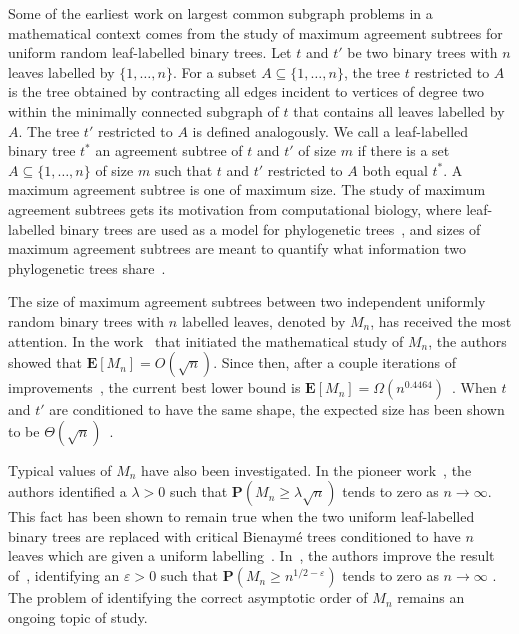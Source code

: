 \documentclass[11pt,reqno]{amsart}
\newcommand{\1}{\mathbf{1}}
\newcommand{\0}{\mathbf{0}}
\newcommand{\prob}{\mathbf{P}}
\newcommand{\ex}{\mathbf{E}}
\begin{document}
Some of the earliest work on largest common subgraph problems in a mathematical context comes from the study of maximum agreement subtrees for uniform random leaf-labelled binary trees. Let $t$ and $t'$ be two binary trees with $n$ leaves labelled by $\{1,\ldots,n\}$. For a subset $A \subseteq \{1,\ldots,n\}$, the tree $t$ restricted to $A$ is the tree obtained by contracting all edges incident to vertices of degree two within the minimally connected subgraph of $t$ that contains all leaves labelled by $A$. The tree $t'$ restricted to $A$ is defined analogously. We call a leaf-labelled binary tree $t^*$ an agreement subtree of $t$ and $t'$ of size $m$ if there is a set $A \subseteq \{1,\ldots,n\}$ of size $m$ such that $t$ and $t'$ restricted to $A$ both equal $t^*$. A maximum agreement subtree is one of maximum size. The study of maximum agreement subtrees gets its motivation from computational biology, where leaf-labelled binary trees are used as a model for phylogenetic trees~\cite{semple2003phylogenetics}, and sizes of maximum agreement subtrees are meant to quantify what information two phylogenetic trees share~\cite{david2003size}. 

The size of maximum agreement subtrees between two independent uniformly random binary trees with $n$ labelled leaves, denoted by $M_n$, has received the most attention. In the work~\cite{david2003size} that initiated the mathematical study of $M_n$, the authors showed that $\ex[M_n] = O(\sqrt{n})$. Since then, after a couple iterations of improvements~\cite{bernstein2015bounds,aldous2022largest}, the current best lower bound is $\ex[M_n] = \Omega(n^{0.4464})$~\cite{khezeli2024improved}. When $t$ and $t'$ are conditioned to have the same shape, the expected size has been shown to be $\Theta(\sqrt{n})$~\cite{misra2019bounds}.

Typical values of $M_n$ have also been investigated. In the pioneer work~\cite{david2003size}, the authors identified a $\lambda > 0$ such that $\prob(M_n \geq \lambda \sqrt{n})$ tends to zero as $n \to \infty$. This fact has been shown to remain true when the two uniform leaf-labelled binary trees are replaced with critical Bienaym\'{e} trees conditioned to have $n$ leaves which are given a uniform labelling~\cite{pittel2023expected}. In~\cite{budzinski2023maximum}, the authors improve the result of~\cite{david2003size}, identifying an $\varepsilon > 0$ such that $\prob(M_n \geq n^{1/2-\varepsilon})$ tends to zero as $n \to \infty$ . The problem of identifying the correct asymptotic order of $M_n$ remains an ongoing topic of study.
\end{document}
